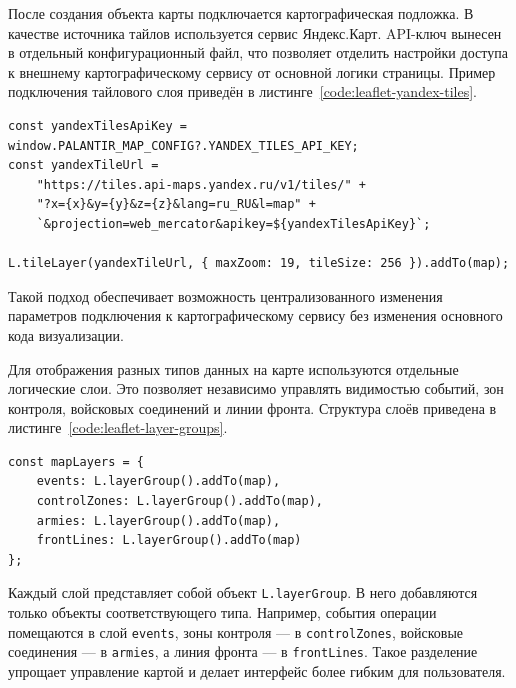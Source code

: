 После создания объекта карты подключается картографическая подложка. В качестве источника тайлов используется сервис Яндекс.Карт. API-ключ вынесен в отдельный конфигурационный файл, что позволяет отделить настройки доступа к внешнему картографическому сервису от основной логики страницы. Пример подключения тайлового слоя приведён в листинге~\ref{code:leaflet-yandex-tiles}.

\begin{code}
\label{code:leaflet-yandex-tiles}
\vspace{-0.75cm}
\begin{verbatim}
const yandexTilesApiKey = window.PALANTIR_MAP_CONFIG?.YANDEX_TILES_API_KEY;
const yandexTileUrl =
    "https://tiles.api-maps.yandex.ru/v1/tiles/" +
    "?x={x}&y={y}&z={z}&lang=ru_RU&l=map" +
    `&projection=web_mercator&apikey=${yandexTilesApiKey}`;

L.tileLayer(yandexTileUrl, { maxZoom: 19, tileSize: 256 }).addTo(map);
\end{verbatim}
\end{code}

Такой подход обеспечивает возможность централизованного изменения параметров подключения к картографическому сервису без изменения основного кода визуализации.

Для отображения разных типов данных на карте используются отдельные логические слои. Это позволяет независимо управлять видимостью событий, зон контроля, войсковых соединений и линии фронта. Структура слоёв приведена в листинге~\ref{code:leaflet-layer-groups}.

\begin{code}
\label{code:leaflet-layer-groups}
\vspace{-0.75cm}
\begin{verbatim}
const mapLayers = {
    events: L.layerGroup().addTo(map),
    controlZones: L.layerGroup().addTo(map),
    armies: L.layerGroup().addTo(map),
    frontLines: L.layerGroup().addTo(map)
};
\end{verbatim}
\end{code}

Каждый слой представляет собой объект \texttt{L.layerGroup}. В него добавляются только объекты соответствующего типа. Например, события операции помещаются в слой \texttt{events}, зоны контроля --- в \texttt{controlZones}, войсковые соединения --- в \texttt{armies}, а линия фронта --- в \texttt{frontLines}. Такое разделение упрощает управление картой и делает интерфейс более гибким для пользователя.

